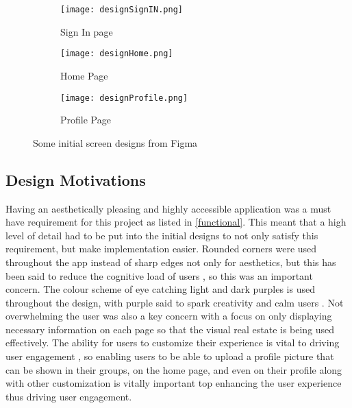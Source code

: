 \begin{figure}[!htbp]
    \centering
    \begin{subfigure}[b]{0.25\textwidth}
        \texttt{[image: designSignIN.png]}
        \caption{Sign In page}
    \end{subfigure}
    \hspace{1.5em}
    \begin{subfigure}[b]{0.25\textwidth}
        \texttt{[image: designHome.png]}
        \caption{Home Page}
    \end{subfigure}
    \hspace{1.5em}
    \begin{subfigure}[b]{0.25\textwidth}
        \texttt{[image: designProfile.png]}
        \caption{Profile Page}
    \end{subfigure}
    \caption{Some initial screen designs from Figma}
    \label{fig:figma}
\end{figure}
\FloatBarrier

\subsection*{Design Motivations}
Having an aesthetically pleasing and highly accessible application was a must have requirement for this project as listed in \ref{functional}. This meant that a high level of detail had to be put into the initial designs to not only satisfy this requirement, but make implementation easier. Rounded corners were used throughout the app instead of sharp edges not only for aesthetics, but this has been said to reduce the cognitive load of users \cite{roundedCorners}, so this was an important concern. The colour scheme of eye catching light and dark purples is used throughout the design, with purple said to spark creativity and calm users \cite{purplePsych}. Not overwhelming the user was also a key concern with a focus on only displaying necessary information on each page so that the visual real estate is being used effectively. The ability for users to customize their experience is vital to driving user engagement \cite{customUserEng}, so enabling users to be able to upload a profile picture that can be shown in their groups, on the home page, and even on their profile along with other customization is vitally important top enhancing the user experience thus driving user engagement. 

